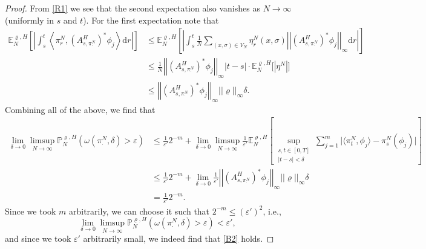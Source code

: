 \documentclass[10pt,a4paper]{amsart}
\newcommand{\E}{\mathbb{E}}
\newcommand{\dd}{\mathrm{d}}
\newcommand{\nn}{\nonumber}
\newcommand{\p}{\mathbb{P}}
\begin{document}
\begin{proof}
From \eqref{R1} we see that the second expectation also vanishes as $N\to\infty$ (uniformly in $s$ and $t$). For the first expectation note that 
    \begin{align}
        \E^{\varrho,H}_N\left[\left|\int_s^t\left\langle \pi^N_{r}, \left(\!A^{H}_{s, \pi^N_\cdot}\!\right)^{\!*} \phi_j\right\rangle\dd r\right|\right] 
        &\leq \E^{\varrho,H}_N\left[\left|\int_s^t \frac{1}{N} \sum_{(x,\sigma)\in V_N}\eta_r^N(x,\sigma) \left|\left|\left(\!A^{H}_{s, \pi^N_\cdot}\!\right)^{\!*}\phi_j\right|\right|_\infty \dd r  \right|\right]\nn\\
        \nn&\leq  \frac{1}{N} \left|\left|\left(\!A^{H}_{s, \pi^N_\cdot}\!\right)^{\!*}\phi_j\right|\right|_\infty |t-s| \cdot \E^{\varrho,H}_N\big[|\eta^N|\big]\\
        &\leq \left|\left|\left(\!A^{H}_{s, \pi^N_\cdot}\!\right)^{\!*}\phi_j\right|\right|_\infty ||\varrho||_\infty \delta .
    \end{align}
Combining  all of the above, we find that 
    \begin{align}
        \lim_{\delta\to0}\limsup_{N\to\infty} \p^{\varrho,H}_N(\omega(\pi^N_{\cdot},\delta)>\varepsilon)
        &\leq  \frac{1}{\varepsilon'} 2^{-m} + \lim_{\delta\to0}\limsup_{N\to\infty} \frac{1}{\varepsilon'} \E^{\varrho,H}_N\left[\sup_{\substack{s,t\in[0,T]\\|t-s|<\delta}}\sum_{j=1}^m \big|\langle \pi^N_{t},\phi_j\rangle - \pi^N_{s}(\phi_j)\big|\right]\nn\\
        \nn&\leq \frac{1}{\varepsilon'} 2^{-m} +\lim_{\delta \to 0} \frac{1}{\varepsilon'}  \left|\left|\left(\!A^{H}_{s, \pi^N_\cdot}\!\right)^{\!*}\phi_j\right|\right|_\infty ||\varrho||_\infty \delta \\
        &= \frac{1}{\varepsilon'} 2^{-m}.
    \end{align}
Since we took $m$ arbitrarily, we can choose it such that $2^{-m} \leq (\varepsilon')^2$, i.e., 
    \begin{equation}
        \lim_{\delta\to0}\limsup_{N\to\infty} \p^{\varrho,H}_N(\omega(\pi^N_{\cdot},\delta)>\varepsilon) < \varepsilon',
    \end{equation}
and since we took $\varepsilon'$ arbitrarily small, we indeed find that \ref{B2} holds. 
\end{proof}
\end{document}
